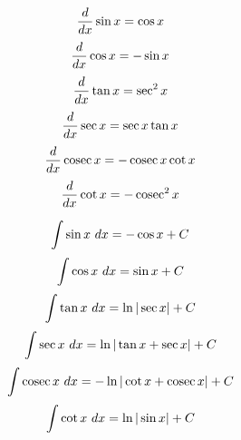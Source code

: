 \documentclass[../main.tex]{subfile}
\begin{document}
\begin{figure}[h]
\centering
\large
\begin{minipage}{0.49\linewidth}
	$$\frac{d}{d x}\sin x = \cos x$$
	\vspace{0.5em}
	$$\frac{d}{d x}\cos x = -\sin x$$
	\vspace{0.5em}
	$$\frac{d}{d x}\tan x = \sec^2 x$$
	\vspace{0.5em}
	$$\frac{d}{d x}\sec x = \sec x\tan x$$
	\vspace{0.5em}
	$$\frac{d}{d x}\mathop{\rm cosec}\nolimits x = -\mathop{\rm cosec}\nolimits x\cot x$$
	\vspace{0.5em}
	$$\frac{d}{d x}\cot x = -\mathop{\rm cosec}\nolimits^2 x$$
\end{minipage}\hfill
\begin{minipage}{0.49\linewidth}
	$$\int \sin x \ d x = -\cos x + C$$
	\vspace{0.5em}
	$$\int \cos x \ d x = \sin x + C$$
	\vspace{0.5em}
	$$\int \tan x \ d x = \ln|\sec x|+ C$$
	\vspace{0.5em}
	$$\int \sec x \ d x = \ln|\tan x + \sec x| + C$$
	\vspace{0.5em}
	$$\int \mathop{\rm cosec}\nolimits x \ d x = -\ln|\cot x + \mathop{\rm cosec}\nolimits x| + C$$
	\vspace{0.5em}
	$$\int \cot x \ d x = \ln|\sin x| + C$$
\end{minipage}
\end{figure}

\newpage

\vspace{-2.5em}


\vspace{-1em}
\end{document}
